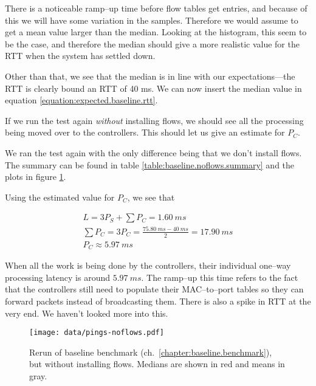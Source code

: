 There is a noticeable ramp--up time before flow tables get entries, and
because of this we will have some variation in the samples. Therefore we
would assume to get a mean value larger than the median.  Looking at the
histogram, this seem to be the case, and therefore the median should give a
more realistic value for the RTT when the system has settled down.

Other than that, we see that the median is in line with our
expectations---the RTT is clearly bound an RTT of 40 ms.  We can now insert
the median value in equation \ref{equation:expected.baseline.rtt}.



If we run the test again \textit{without} installing flows, we should see
all the processing being moved over to the controllers.  This should let us
give an estimate for $P_C$.

We ran the test again  with the only difference being that we don't
install flows.  The summary can be found in table
\ref{table:baseline.noflows.summary} and the plots in figure
\ref{figure:baseline.noflows.plots}.

Using the estimated value for $P_C$, we see that

\begin{gather*}
  L = 3P_S + \sum P_C = 1.60~ms \\
  \sum P_C = 3P_C = \frac{75.80~ms - 40~ms}{2} = 17.90~ms \\
  P_C \approx 5.97~ms
\end{gather*}

When all the work is being done by the controllers, their individual
one--way processing latency is around $5.97~ms$.  The ramp--up this time
refers to the fact that the controllers still need to populate their
MAC--to--port tables so they can forward packets instead of broadcasting
them.  There is also a spike in RTT at the very end.  We haven't looked more
into this.



\begin{figure}
  \centering
  \texttt{[image: data/pings-noflows.pdf]}
  \caption{Rerun of baseline benchmark
    (ch.~\ref{chapter:baseline.benchmark}), but without installing flows.
  Medians are shown in red and means in gray.}
  \label{figure:baseline.noflows.plots}
\end{figure}

